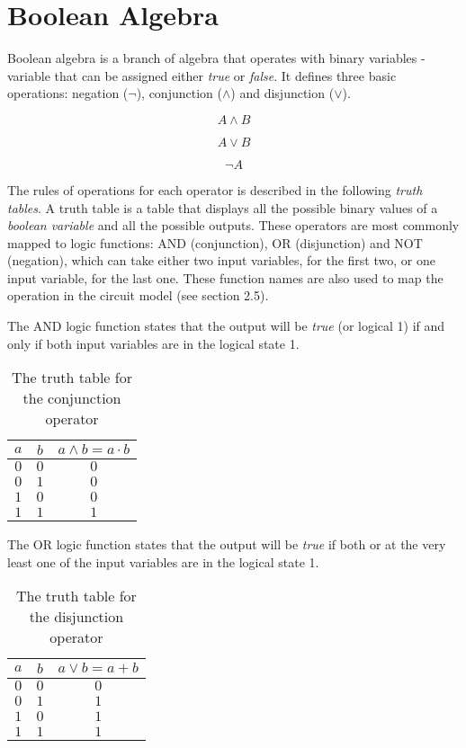 \section{Boolean Algebra}

Boolean algebra is a branch of algebra that operates with binary variables - variable that can be assigned
either \textit{true} or \textit{false}. It defines three basic operations: negation ($\lnot$), conjunction
($\land$) and disjunction ($\lor$).

\begin{equation}
    A \land B
\end{equation}

\begin{equation}
    A \lor B
\end{equation}

\begin{equation}
    \lnot A
\end{equation}

The rules of operations for each operator is described in the following \textit{truth tables}. A truth
table is a table that displays all the possible binary values of a \textit{boolean variable}
and all the possible outputs. These operators are most commonly mapped to logic functions:
AND (conjunction), OR (disjunction) and NOT (negation), which can take either two input variables, for
the first two, or one input variable, for the last one. These function names are also used to map
the operation in the circuit model (see section 2.5).

The AND logic function states that the output will be \textit{true} (or logical 1) if and only if
both input variables are in the logical state 1.
\begin{table}[ht]
    \centering
    \begin{tabular}{cc|c}
        $a$ & $b$ & $a \land b = a \cdot b$ \\
        \hline
        $0$ & $0$ & $0$ \\
        $0$ & $1$ & $0$ \\
        $1$ & $0$ & $0$ \\
        $1$ & $1$ & $1$ \\
    \end{tabular}
    \caption{The truth table for the conjunction operator}
\end{table}

The OR logic function states that the output will be \textit{true} if both or at the very least
one of the input variables are in the logical state 1.
\begin{table}[ht]
    \centering
    \begin{tabular}{cc|c}
        $a$ & $b$ & $a \lor b = a + b$ \\
        \hline
        $0$ & $0$ & $0$ \\
        $0$ & $1$ & $1$ \\
        $1$ & $0$ & $1$ \\
        $1$ & $1$ & $1$ \\
    \end{tabular}
    \caption{The truth table for the disjunction operator}
\end{table}

